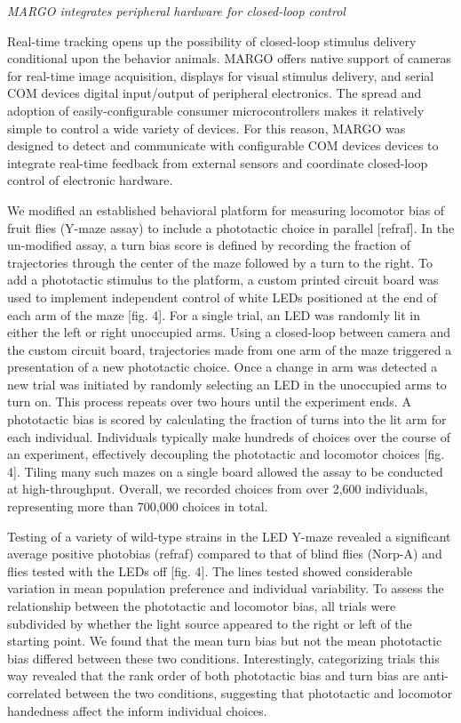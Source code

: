 \documentclass[10pt]{article}
\begin{document}
\begin{multicols}{2}
\textit{MARGO integrates peripheral hardware for closed-loop control}

Real-time tracking opens up the possibility of closed-loop stimulus delivery conditional upon the behavior animals. MARGO offers native support of cameras for real-time image acquisition, displays for visual stimulus delivery, and serial COM devices digital input/output of peripheral electronics. The spread and adoption of easily-configurable consumer microcontrollers makes it relatively simple to control a wide variety of devices. For this reason, MARGO was designed to detect and communicate with configurable COM devices devices to integrate real-time feedback from external sensors and coordinate closed-loop control of electronic hardware.

We modified an established behavioral platform for measuring locomotor bias of fruit flies (Y-maze assay) to include a phototactic choice in parallel [refraf]. In the un-modified assay, a turn bias score is defined by recording the fraction of trajectories through the center of the maze followed by a turn to the right. To add a phototactic stimulus to the platform, a custom printed circuit board was used to implement independent control of white LEDs positioned at the end of each arm of the maze [fig. 4]. For a single trial, an LED was randomly lit in either the left or right unoccupied arms. Using a closed-loop between camera and the custom circuit board, trajectories made from one arm of the maze triggered a presentation of a new phototactic choice. Once a change in arm was detected a new trial was initiated by randomly selecting an LED in the unoccupied arms to turn on. This process repeats over two hours until the experiment ends. A phototactic bias is scored by calculating the fraction of turns into the lit arm for each individual. Individuals typically make hundreds of choices over the course of an experiment, effectively decoupling the phototactic and locomotor choices [fig. 4]. Tiling many such mazes on a single board allowed the assay to be conducted at high-throughput. Overall, we recorded choices from over 2,600 individuals, representing more than 700,000 choices in total.

Testing of a variety of wild-type strains in the LED Y-maze revealed a significant average positive photobias (refraf) compared to that of blind flies (Norp-A) and flies tested with the LEDs off [fig. 4]. The lines tested showed considerable variation in mean population preference and individual variability. To assess the relationship between the phototactic and locomotor bias, all trials were subdivided by whether the light source appeared to the right or left of the starting point. We found that the mean turn bias but not the mean phototactic bias differed between these two conditions. Interestingly, categorizing trials this way revealed that the rank order of both phototactic bias and turn bias are anti-correlated between the two conditions, suggesting that phototactic and locomotor handedness affect the inform individual choices. 


\end{multicols}
\end{document}
